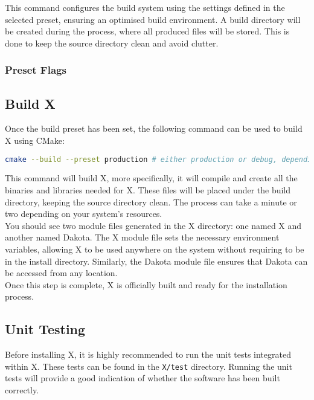 \documentclass[a4paper,12pt]{article}
\begin{document}
This command configures the build system using the settings defined in the selected preset, ensuring an optimised build environment. A build directory will be created during the process, where all produced files will be stored. This is done to keep the source directory clean and avoid clutter.

\subsubsection{Preset Flags}

\subsection{Build X}

Once the build preset has been set, the following command can be used to build X using CMake:

\vspace{1em}
\begin{lstlisting}[language=bash]
    cmake --build --preset production # either production or debug, depending on preset applied
\end{lstlisting}
\vspace{1em}

This command will build X, more specifically, it will compile and create all the binaries and libraries needed for X. These files will be placed under the build directory, keeping the source directory clean. The process can take a minute or two depending on your system's resources. \\

You should see two module files generated in the X directory: one named X and another named Dakota. The X module file sets the necessary environment variables, allowing X to be used anywhere on the system without requiring to be in the install directory. Similarly, the Dakota module file ensures that Dakota can be accessed from any location. \\

Once this step is complete, X is officially built and ready for the installation process. \\ 

\subsection{Unit Testing}

Before installing X, it is highly recommended to run the unit tests integrated within X. These tests can be found in the \texttt{X/test} directory. Running the unit tests will provide a good indication of whether the software has been built correctly. \\
\end{document}
